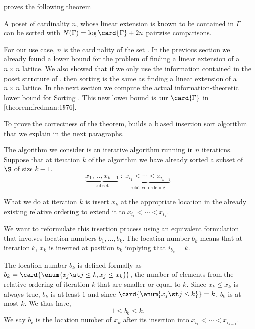 \citet{fredman:1976} proves the following theorem
\begin{theorem}\label{theorem:fredman:1976}
A poset of cardinality $n$, whose linear extension is known to be contained in
$\Gamma$ can be sorted with $N(\Gamma) = \log \card{\Gamma} + 2n$ pairwise
comparisons.
\end{theorem}
For our use case, \(n\) is the cardinality of the set
\XY. In the previous section we already found a lower bound for the problem of
finding a linear extension of a \(n \times n\) lattice. We also showed that if
we only use the information contained in the poset structure of \XY, then
sorting \XY is the same as finding a linear extension of a \(n \times
n\) lattice. In the next section we compute the actual information-theoretic lower bound for
Sorting \XY. This
new lower bound is our $\card{\Gamma}$ in \ref{theorem:fredman:1976}.

To prove the correctness of the theorem, \citet{fredman:1976} builds a biased
insertion sort algorithm that we explain in the next paragraphs.

The algorithm we consider is an iterative algorithm running in \(n\)
iterations. Suppose that at iteration \(k\) of the algorithm we have already sorted a
subset of \(\S\) of size \(k-1\).
\begin{displaymath}
\underbrace{x_1, \ldots, x_{k-1}}_{\text{subset}}~:~\underbrace{x_{i_1} <
\cdots < x_{i_{k-1}}}_{\text{relative ordering}}
\end{displaymath}

What we do at iteration $k$ is insert $x_k$ at the appropriate location
in the already existing relative ordering to extend it to $x_{i_1} < \cdots <
x_{i_k}$.

We want to reformulate this insertion process using an equivalent formulation
that involves location numbers $b_1, \ldots, b_k$. The location
number $b_k$ means that at iteration $k$, $x_k$ is inserted at position
$b_k$ implying that $i_{b_k} = k$.

The location number $b_k$ is defined formally as $b_k = \card{\enum{x_j \st j
\le k, x_j \le x_k}}$, \ie the number of elements from the relative ordering
of iteration $k$ that are smaller or equal to $k$. Since $x_k \le x_k$ is
always true, $b_k$ is at least $1$ and since $\card{\enum{x_j \st j \le k}} =
k$, $b_k$ is at most $k$. We thus have,
\begin{displaymath}
1 \le b_k \le k.
\end{displaymath}
We say $b_k$ is the location number of $x_k$ after its insertion into
$x_{i_1} < \cdots < x_{i_{k-1}}$.

